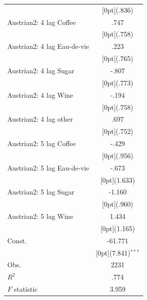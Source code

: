 \documentclass[12pt,a4paper,titlepage]{article}
\begin{document}
{\begin{tabular*}{\textwidth}{@{\extracolsep{\fill}}lc}
&	\raisebox{.7ex}[0pt]{\scriptsize (.836)} \\
Austrian2: 4 lag Coffee &	.747 \\
&	\raisebox{.7ex}[0pt]{\scriptsize (.758)} \\
Austrian2: 4 lag Eau-de-vie &	.223 \\
&	\raisebox{.7ex}[0pt]{\scriptsize (.765)} \\
Austrian2: 4 lag Sugar &	-.807 \\
&	\raisebox{.7ex}[0pt]{\scriptsize (.773)} \\
Austrian2: 4 lag Wine &	-.194 \\
&	\raisebox{.7ex}[0pt]{\scriptsize (.758)} \\
Austrian2: 4 lag other &	.697 \\
&	\raisebox{.7ex}[0pt]{\scriptsize (.752)} \\
Austrian2: 5 lag Coffee &	-.429 \\
&	\raisebox{.7ex}[0pt]{\scriptsize (.956)} \\
Austrian2: 5 lag Eau-de-vie &	-.673 \\
&	\raisebox{.7ex}[0pt]{\scriptsize (1.633)} \\
Austrian2: 5 lag Sugar &	-1.160 \\
&	\raisebox{.7ex}[0pt]{\scriptsize (.960)} \\
Austrian2: 5 lag Wine &	1.434 \\
&	\raisebox{.7ex}[0pt]{\scriptsize (1.165)} \\
Const. &	-61.771 \\
&	\raisebox{.7ex}[0pt]{\scriptsize (7.841)$^{***}$} \\
Obs. &	2231 \\
$ R^2$ &	.774 \\
$ F$ statistic &	3.959 \\
\hline\hline	
\end{tabular*}%


}
\end{document}
